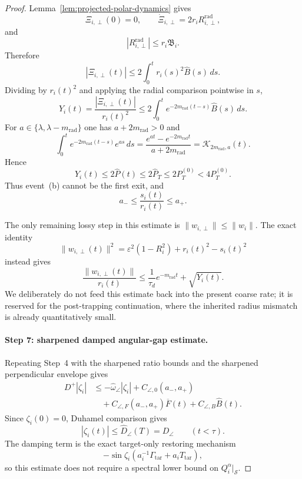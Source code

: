 \documentclass{article} %
\theoremstyle{plain}
\theoremstyle{definition}
\theoremstyle{remark}
\begin{document}
\begin{proof}
Lemma~\ref{lem:projected-polar-dynamics} gives
\[
\Xi_{i,\perp}(0)=0,
\qquad
\dot\Xi_{i,\perp}=2r_iR_{i,\perp}^{\mathrm{rad}},
\]
and
\[
|R_{i,\perp}^{\mathrm{rad}}|
\le
r_i\mathfrak B_i.
\]
Therefore
\[
|\Xi_{i,\perp}(t)|
\le
2\int_0^t r_i(s)^2\widehat B(s)\,ds.
\]
Dividing by $r_i(t)^2$ and applying the radial comparison pointwise in $s$,
\[
Y_i(t)
=
\frac{|\Xi_{i,\perp}(t)|}{r_i(t)^2}
\le
2\int_0^t
e^{-2m_{\mathrm{rad}}(t-s)}\widehat B(s)\,ds.
\]
For $a\in\{\lambda,\lambda-m_{\mathrm{rad}}\}$ one has
$a+2m_{\mathrm{rad}}>0$ and
\[
\int_0^t
e^{-2m_{\mathrm{rad}}(t-s)}e^{as}\,ds
=
\frac{e^{at}-e^{-2m_{\mathrm{rad}}t}}{a+2m_{\mathrm{rad}}}
=
\mathcal K_{2m_{\mathrm{rad}},a}(t).
\]
Hence
\[
\boxed{
Y_i(t)
\le
2\widehat P(t)
\le
2\widehat P_T
\le
2P_T^{(0)}
<
4P_T^{(0)}.
}
\]
Thus event~\textnormal{(b)} cannot be the first exit, and
\[
\boxed{
a_-
\le
\frac{s_i(t)}{r_i(t)}
\le
a_+.
}
\]

The only remaining lossy step in this estimate is
$\|w_{i,\perp}\|\le\|w_i\|$.  The exact identity
\[
\|w_{i,\perp}(t)\|^2
=
\varepsilon^2(1-R_i^2)+r_i(t)^2-s_i(t)^2
\]
instead gives
\[
\frac{\|w_{i,\perp}(t)\|}{r_i(t)}
\le
\frac1{\tau_d}e^{-m_{\mathrm{rad}}t}
+
\sqrt{Y_i(t)}.
\]
We deliberately do not feed this estimate back into the present coarse rate;
it is reserved for the post-trapping continuation, where the inherited
radius mismatch is already quantitatively small.

\paragraph{Step 7: sharpened damped angular-gap estimate.}

Repeating Step~4 with the sharpened ratio bounds and the sharpened
perpendicular envelope gives
\[
\begin{aligned}
D^+|\zeta_i|
&\le
-\widehat\omega_\angle|\zeta_i|
+
C_{\angle,0}(a_-,a_+)
\\
&\quad+
C_{\angle,F}(a_-,a_+)\overline F(t)
+
C_{\angle,B}\widehat B(t).
\end{aligned}
\]
Since $\zeta_i(0)=0$, Duhamel comparison gives
\[
\boxed{
|\zeta_i(t)|
\le
\widehat D_\angle(T)
=
D_\angle
}
\qquad
(t<\tau).
\]
The damping term is the exact target-only restoring mechanism
\[
-\sin\zeta_i
\left(
a_i^{-1}\Gamma_{\mathrm{tar}}
+
a_iT_{\mathrm{tar}}
\right),
\]
so this estimate does not require a spectral lower bound on
$Q_i^\alpha|_{\mathcal S}$.


\end{proof}
\end{document}
